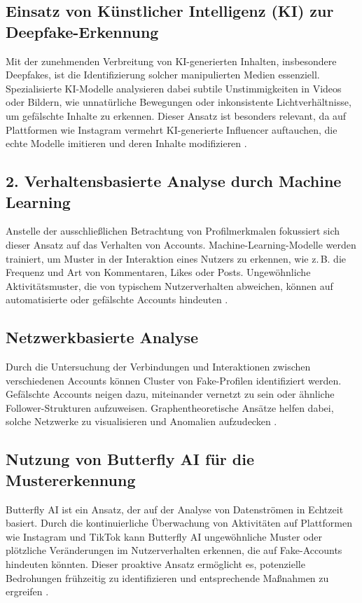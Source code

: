 \documentclass[12pt]{report}
\begin{document}
\subsection{Einsatz von Künstlicher Intelligenz (KI) zur Deepfake-Erkennung}
Mit der zunehmenden Verbreitung von KI-generierten Inhalten, insbesondere Deepfakes, ist die Identifizierung solcher manipulierten Medien essenziell. Spezialisierte KI-Modelle analysieren dabei subtile Unstimmigkeiten in Videos oder Bildern, wie unnatürliche Bewegungen oder inkonsistente Lichtverhältnisse, um gefälschte Inhalte zu erkennen. Dieser Ansatz ist besonders relevant, da auf Plattformen wie Instagram vermehrt KI-generierte Influencer auftauchen, die echte Modelle imitieren und deren Inhalte modifizieren \cite{wired2023deepfake}.

\subsection{2. Verhaltensbasierte Analyse durch Machine Learning}
Anstelle der ausschließlichen Betrachtung von Profilmerkmalen fokussiert sich dieser Ansatz auf das Verhalten von Accounts. Machine-Learning-Modelle werden trainiert, um Muster in der Interaktion eines Nutzers zu erkennen, wie z. B. die Frequenz und Art von Kommentaren, Likes oder Posts. Ungewöhnliche Aktivitätsmuster, die von typischem Nutzerverhalten abweichen, können auf automatisierte oder gefälschte Accounts hindeuten \cite{cresci2020decade}.

\subsection{Netzwerkbasierte Analyse}
Durch die Untersuchung der Verbindungen und Interaktionen zwischen verschiedenen Accounts können Cluster von Fake-Profilen identifiziert werden. Gefälschte Accounts neigen dazu, miteinander vernetzt zu sein oder ähnliche Follower-Strukturen aufzuweisen. Graphentheoretische Ansätze helfen dabei, solche Netzwerke zu visualisieren und Anomalien aufzudecken \cite{cao2020synthetic}.

\subsection{Nutzung von Butterfly AI für die Mustererkennung}
Butterfly AI ist ein Ansatz, der auf der Analyse von Datenströmen in Echtzeit basiert. Durch die kontinuierliche Überwachung von Aktivitäten auf Plattformen wie Instagram und TikTok kann Butterfly AI ungewöhnliche Muster oder plötzliche Veränderungen im Nutzerverhalten erkennen, die auf Fake-Accounts hindeuten könnten. Dieser proaktive Ansatz ermöglicht es, potenzielle Bedrohungen frühzeitig zu identifizieren und entsprechende Maßnahmen zu ergreifen \cite{stolfo2000behavior}.
\end{document}
